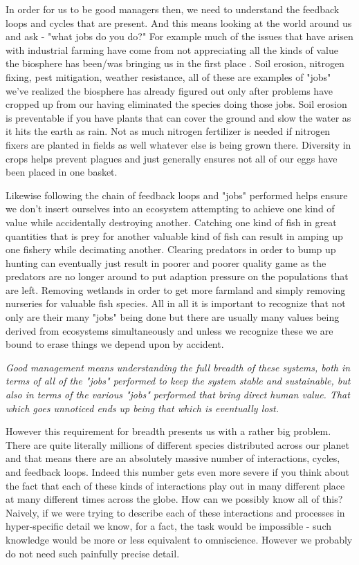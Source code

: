 \documentclass[11pt,a5paper]{book}
\begin{document}
In order for us to be good managers then, we need to understand the feedback loops and cycles that are present. And this means looking at the world around us and ask - "what jobs do you do?" For example much of the issues that have arisen with industrial farming have come from not appreciating all the kinds of value the biosphere has been/was bringing us in the first place \cite{biomimicry}. Soil erosion, nitrogen fixing, pest mitigation, weather resistance, all of these are examples of "jobs" we've realized the biosphere has already figured out only after problems have cropped up from our having eliminated the species doing those jobs. Soil erosion is preventable if you have plants that can cover the ground and slow the water as it hits the earth as rain. Not as much nitrogen fertilizer is needed if nitrogen fixers are planted in fields as well whatever else is being grown there. Diversity in crops helps prevent plagues and just generally ensures not all of our eggs have been placed in one basket.

Likewise following the chain of feedback loops and "jobs" performed helps ensure we don't insert ourselves into an ecosystem attempting to achieve one kind of value while accidentally destroying another. Catching one kind of fish in great quantities that is prey for another valuable kind of fish can result in amping up one fishery while decimating another. Clearing predators in order to bump up hunting can eventually just result in poorer and poorer quality game as the predators are no longer around to put adaption pressure on the populations that are left. Removing wetlands in order to get more farmland and simply removing nurseries for valuable fish species. All in all it is important to recognize that not only are their many "jobs" being done but there are usually many values being derived from ecosystems simultaneously and unless we recognize these we are bound to erase things we depend upon by accident. \newline

\textit{Good management means understanding the full breadth of these systems, both in terms of all of the "jobs" performed to keep the system stable and sustainable, but also in terms of the various "jobs" performed that bring direct human value. That which goes unnoticed ends up being that which is eventually lost. }\newline

However this requirement for breadth presents us with a rather big problem. There are quite literally millions of different species distributed across our planet and that means there are an absolutely massive number of interactions, cycles, and feedback loops. Indeed this number gets even more severe if you think about the fact that each of these kinds of interactions play out in many different place at many different times across the globe. How can we possibly know all of this? Naively, if we were trying to describe each of these interactions and processes in hyper-specific detail we know, for a fact, the task would be impossible - such knowledge would be more or less equivalent to omniscience. However we probably do not need such painfully precise detail. 
\end{document}
